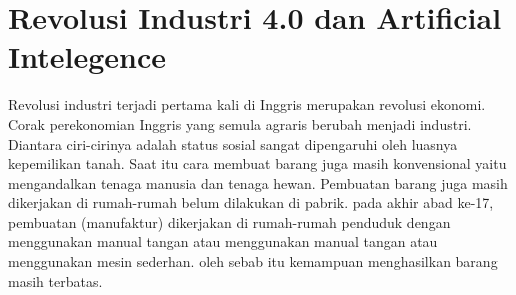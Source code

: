 \section{Revolusi Industri 4.0 dan Artificial Intelegence}
Revolusi industri terjadi pertama kali di Inggris merupakan revolusi ekonomi. Corak perekonomian Inggris yang semula agraris berubah menjadi industri. Diantara ciri-cirinya adalah status sosial sangat dipengaruhi oleh luasnya kepemilikan tanah. Saat itu cara membuat barang juga masih konvensional yaitu mengandalkan tenaga manusia dan tenaga hewan. Pembuatan barang juga masih dikerjakan di rumah-rumah belum dilakukan di pabrik.
pada akhir abad ke-17, pembuatan (manufaktur) dikerjakan di rumah-rumah penduduk dengan menggunakan manual tangan atau menggunakan manual tangan atau menggunakan mesin sederhan. oleh sebab itu kemampuan menghasilkan barang masih terbatas.
